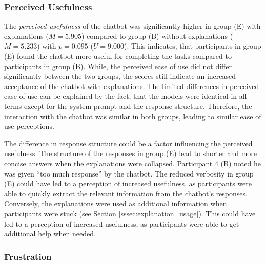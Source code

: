 \subsubsection{Perceived Usefulness} \label{sssec:model_acceptance}

The \textit{perceived usefulness} of the chatbot was significantly higher in group (E) with explanations ($M=5.905$) compared to group (B) without explanations ($M=5.233$) with $p=0.095$ ($U=9.000$). This indicates, that participants in group (E) found the chatbot more useful for completing the tasks compared to participants in group (B). While, the perceived ease of use did not differ significantly between the two groups, the scores still indicate an increased acceptance of the chatbot with explanations. The limited differences in perceived ease of use can be explained by the fact, that the models were identical in all terms except for the system prompt and the response structure. Therefore, the interaction with the chatbot was similar in both groups, leading to similar ease of use perceptions.

The difference in response structure could be a factor influencing the perceived usefulness. The structure of the responses in group (E) lead to shorter and more concise answers when the explanations were collapsed. Participant 4 (B) noted he was given “too much response” by the chatbot. The reduced verbosity in group (E) could have led to a perception of increased usefulness, as participants were able to quickly extract the relevant information from the chatbot's responses. Conversely, the explanations were used as additional information when participants were stuck (see Section \ref{sssec:explanation_usage}). This could have led to a perception of increased usefulness, as participants were able to get additional help when needed.


\subsubsection{Frustration} \label{sssec:frustration}

